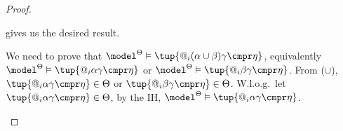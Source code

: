 \documentclass[10pt,a4paper]{amsart}
\theoremstyle{definition}
\theoremstyle{remark}
\begin{document}
\begin{proof}
\begin{description}
\begin{description}
                 gives us the desired result.
            \item[($\varphi = \tup{@_i (\alpha \cup \beta) \gamma \cmpr \eta}$)]
                We need to prove that $\model^\Theta \vDash \tup{@_i (\alpha \cup \beta) \gamma \cmpr \eta}$, equivalently $\model^\Theta \vDash \tup{@_i\alpha\gamma \cmpr \eta}$ or $\model^\Theta \vDash \tup{@_i \beta\gamma \cmpr \eta}$.
                From ($\cup$), $\tup{@_i\alpha\gamma \cmpr \eta} \in \Theta$ or $\tup{@_i\beta\gamma \cmpr \eta} \in \Theta$.
                W.l.o.g.\ let $\tup{@_i\alpha\gamma \cmpr \eta} \in \Theta$, by the IH, $\model^{\Theta} \vDash \tup{@_i\alpha\gamma \cmpr \eta}$.

\end{description}
\end{description}
\end{proof}
\end{document}
